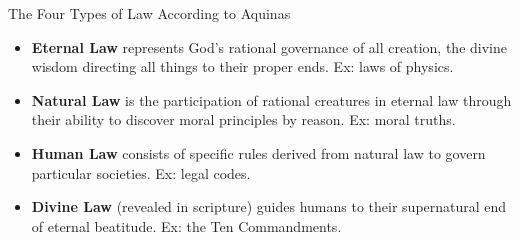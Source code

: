 \documentclass{beamer}
\begin{document}
\begin{frame}{The Four Types of Law According to Aquinas}
    \begin{itemize}
        \item \textbf{Eternal Law} represents God's rational governance of all creation, the divine wisdom directing all things to their proper ends. Ex: laws of physics.
        
        \item \textbf{Natural Law} is the participation of rational creatures in eternal law through their ability to discover moral principles by reason. Ex: moral truths.
        
        \item \textbf{Human Law} consists of specific rules derived from natural law to govern particular societies. Ex: legal codes.
         
        \item \textbf{Divine Law} (revealed in scripture) guides humans to their supernatural end of eternal beatitude. Ex: the Ten Commandments.
    \end{itemize}
\end{frame}
\end{document}
